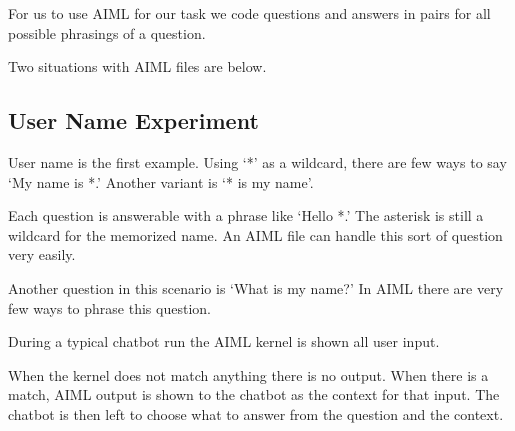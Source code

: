 For us to use AIML for our task we code questions and answers in pairs for all possible phrasings of a question.



Two situations with AIML files are below.

\subsection{User Name Experiment}
User name is the first example. Using `*' as a wildcard, there are few ways to say `My name is *.' Another variant is `* is my name'. %

Each question is answerable with a phrase like `Hello *.' The asterisk is still a wildcard for the memorized name. An AIML file can handle this sort of question very easily. %

Another question in this scenario is `What is my name?' In AIML there are very few ways to phrase this question. %

During a typical chatbot run the AIML kernel is shown all user input.%

When the kernel does not match anything there is no output. When there is a match, AIML output is shown to the chatbot as the context for that input. 
The chatbot is then left to choose what to answer from the question and the context. 

